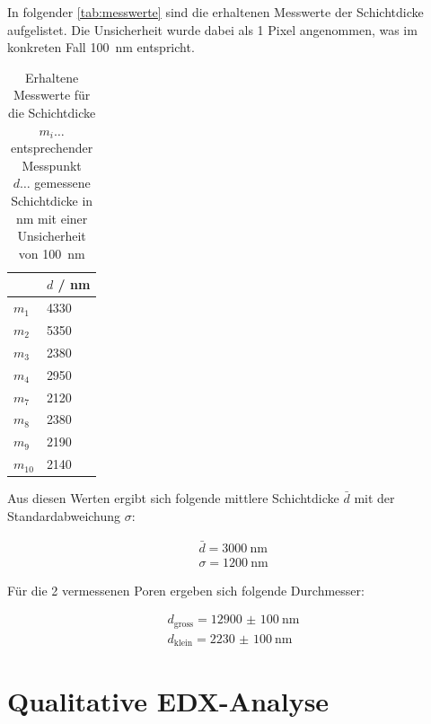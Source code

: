 \documentclass[12pt,english,ngerman]{scrartcl}
\begin{document}
In folgender \autoref{tab:messwerte} sind die erhaltenen Messwerte der
Schichtdicke aufgelistet. Die Unsicherheit wurde dabei als 1 Pixel angenommen,
was im konkreten Fall \SI{100}{\nano\m} entspricht.

\begin{table}[H]
	\caption[Erhaltene Messwerte für die Schichtdicke]{Erhaltene Messwerte für die
		Schichtdicke                         \\
		$m_i \dots$ entsprechender Messpunkt \\
		$d \dots$ gemessene Schichtdicke in nm mit einer Unsicherheit von \SI{100}{\nano\m}
	}
	\centering
	\begin{tabular}{|l|l|}
		\hline
		         & $d$ / nm    \\ \hline
		$m_{1}$  & \SI{4330}{} \\ \hline
		$m_{2}$  & \SI{5350}{} \\ \hline
		$m_{3}$  & \SI{2380}{} \\ \hline
		$m_{4}$  & \SI{2950}{} \\ \hline
		$m_{7}$  & \SI{2120}{} \\ \hline
		$m_{8}$  & \SI{2380}{} \\ \hline
		$m_{9}$  & \SI{2190}{} \\ \hline
		$m_{10}$ & \SI{2140}{} \\ \hline

	\end{tabular}\label{tab:messwerte}
\end{table}


Aus diesen Werten ergibt sich folgende mittlere Schichtdicke $\bar{d}$ mit der
Standardabweichung $\sigma$:

\begin{align*}
	\bar{d} = \SI{3000}{\nano\m} \\
	\sigma = \SI{1200}{\nano\m}
\end{align*}

Für die 2 vermessenen Poren ergeben sich folgende Durchmesser:

\begin{align*}
	d_\text{gross} = \SI{12900(100)}{\nano\m} \\
	d_\text{klein} = \SI{2230(100)}{\nano\m}
\end{align*}

\section{Qualitative EDX-Analyse}
\end{document}
